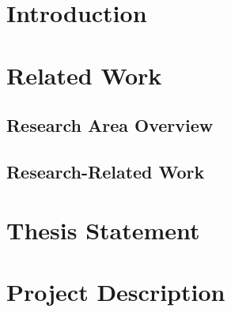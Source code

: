 \documentclass[phd]{byuprop}
\title{\Title}
\author{\Author}
\begin{document}
\maketitle

\section{Introduction}



\section{Related Work}

\subsection{Research Area Overview}


\subsection{Research-Related Work}

\section{Thesis Statement}

\section{Project Description}
\end{document}
